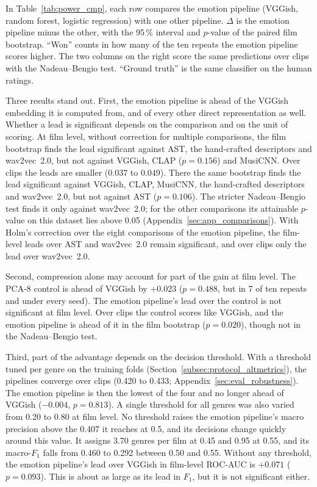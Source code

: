 In Table~\ref{tab:power_cmp}, each row compares the emotion pipeline (VGGish, random forest,
logistic regression) with one other pipeline. $\Delta$ is the emotion pipeline minus the
other, with the 95\,\% interval and $p$-value of the paired film bootstrap. ``Won'' counts
in how many of the ten repeats the emotion pipeline scores higher. The two columns on the
right score the same predictions over clips with the Nadeau--Bengio test. ``Ground truth''
is the same classifier on the human ratings.

Three results stand out. First, the emotion pipeline is ahead of the VGGish embedding it is computed from, and of
every other direct representation as well. Whether a lead is significant depends on the comparison and on the
unit of scoring. At film level, without correction for multiple comparisons, the film bootstrap finds the lead significant against AST,
the hand-crafted descriptors and wav2vec~2.0, but not against VGGish, CLAP
($p=0.156$) and MusiCNN. Over clips the leads are smaller (0.037 to 0.049).
There the same bootstrap finds the lead significant against VGGish, CLAP, MusiCNN, the
hand-crafted descriptors and wav2vec~2.0, but not against AST ($p=0.106$). The stricter Nadeau--Bengio test finds it only against wav2vec~2.0; for the other comparisons its attainable $p$-value on this dataset lies above 0.05 (Appendix~\ref{sec:app_comparisons}). With Holm's correction over the eight comparisons of the emotion pipeline, the film-level leads over AST and wav2vec~2.0 remain significant, and over clips only the lead over wav2vec~2.0.

Second, compression alone may account for part of the gain at film level. The PCA-8 control is ahead
of VGGish by $+0.023$ ($p=0.488$, but in 7 of ten repeats and under every seed). The
emotion pipeline's lead over the control is not significant at film level. Over clips the
control scores like VGGish, and the emotion pipeline is ahead of it in the film bootstrap
($p=0.020$), though not in the Nadeau--Bengio test.

Third, part of the advantage depends on the decision threshold. With a threshold tuned per
genre on the training folds (Section~\ref{subsec:protocol_altmetrics}), the pipelines
converge over clips (0.420 to 0.433; Appendix~\ref{sec:eval_robustness}). The emotion
pipeline is then the lowest of the four and no longer ahead of VGGish ($-0.004$, $p=0.813$).
A single threshold for all genres was also varied from 0.20 to 0.80 at film level. No
threshold raises the emotion pipeline's macro precision above the 0.407 it reaches at 0.5,
and its decisions change quickly around this value. It assigns 3.70 genres per film at 0.45
and 0.95 at 0.55, and its macro-$F_1$ falls from 0.460 to 0.292 between 0.50 and 0.55. Without any
threshold, the emotion pipeline's lead over VGGish in film-level ROC-AUC is $+0.071$
($p=0.093$). This is about as large as its lead in $F_1$, but it is not significant either.

